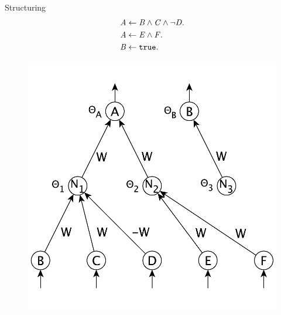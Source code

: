 \documentclass[presentation]{beamer}\mode<presentation>{\usetheme{AMSBolognaFC}}
\begin{document}
\begin{frame}[allowframebreaks]{Structuring}
    \begin{equation*}
        \begin{aligned}
            \mathit{A}&\leftarrow\mathit{B}\wedge\mathit{C}\wedge\neg\mathit{D}.\\
            \mathit{A}&\leftarrow\mathit{E}\wedge\mathit{F}.\\
            \mathit{B}&\leftarrow\mathtt{true}.\\
        \end{aligned}    
    \end{equation*}
    \begin{figure}
        \centering
        \includegraphics[height=0.5\textheight]{figures/structuring-example}
    \end{figure}
\end{frame}
\end{document}
